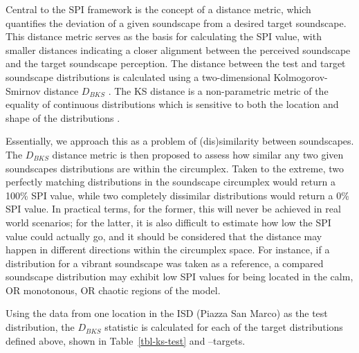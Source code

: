 \documentclass[
  authoryear,
  3p]{elsarticle}
\begin{document}
Central to the SPI framework is the concept of a distance metric, which
quantifies the deviation of a given soundscape from a desired target
soundscape. This distance metric serves as the basis for calculating the
SPI value, with smaller distances indicating a closer alignment between
the perceived soundscape and the target soundscape perception. The
distance between the test and target soundscape distributions is
calculated using a two-dimensional Kolmogorov-Smirnov distance
\(D_{BKS}\) \citep{Fasano1987multidimensional}. The KS distance is a
non-parametric metric of the equality of continuous distributions which
is sensitive to both the location and shape of the distributions
\citep{Chakravati1967Handbook}.

Essentially, we approach this as a problem of (dis)similarity between
soundscapes. The \(D_{BKS}\) distance metric is then proposed to assess
how similar any two given soundscapes distributions are within the
circumplex. Taken to the extreme, two perfectly matching distributions
in the soundscape circumplex would return a 100\% SPI value, while two
completely dissimilar distributions would return a 0\% SPI value. In
practical terms, for the former, this will never be achieved in real
world scenarios; for the latter, it is also difficult to estimate how
low the SPI value could actually go, and it should be considered that
the distance may happen in different directions within the circumplex
space. For instance, if a distribution for a vibrant soundscape was
taken as a reference, a compared soundscape distribution may exhibit low
SPI values for being located in the calm, OR monotonous, OR chaotic
regions of the model.

Using the data from one location in the ISD (Piazza San Marco) as the
test distribution, the \(D_{BKS}\) statistic is calculated for each of
the target distributions defined above, shown in Table~\ref{tbl-ks-test}
and \citet{fig}--targets.
\end{document}
